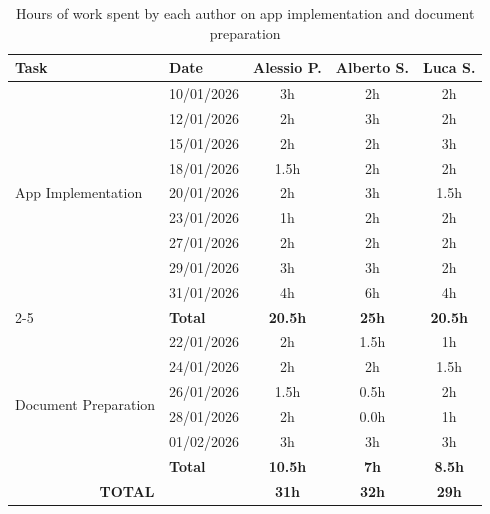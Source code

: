 \begin{table}[H]
\centering
\begin{tabular}{|p{4.5cm}|l|c|c|c|}
\hline
\textbf{Task} & \textbf{Date} & \textbf{Alessio P.} & \textbf{Alberto S.} & \textbf{Luca S.} \\ 
\hline

\multirow{9}{=}{App Implementation} 
& 10/01/2026 & 3h & 2h & 2h \\  
& 12/01/2026 & 2h & 3h & 2h \\
& 15/01/2026 & 2h & 2h & 3h \\
& 18/01/2026 & 1.5h & 2h & 2h \\
& 20/01/2026 & 2h & 3h & 1.5h \\
& 23/01/2026 & 1h & 2h & 2h \\
& 27/01/2026 & 2h & 2h & 2h \\
& 29/01/2026 & 3h & 3h & 2h \\
& 31/01/2026 & 4h & 6h & 4h \\
\cline{2-5}
& \textbf{Total} & \textbf{20.5h} & \textbf{25h} & \textbf{20.5h} \\ 
\hline

\multirow{6}{=}{Document Preparation} 
& 22/01/2026 & 2h & 1.5h & 1h \\  
& 24/01/2026 & 2h & 2h & 1.5h \\
& 26/01/2026 & 1.5h & 0.5h & 2h \\
& 28/01/2026 & 2h & 0.0h & 1h \\ %
& 01/02/2026 & 3h & 3h & 3h \\
\cline{2-5}
& \textbf{Total} & \textbf{10.5h} & \textbf{7h} & \textbf{8.5h} \\ 
\hline

\multicolumn{2}{|c|}{\textbf{TOTAL}} & \textbf{31h} & \textbf{32h} & \textbf{29h} \\
\hline

\end{tabular}
\caption{Hours of work spent by each author on app implementation and document preparation}
\label{tab:effort}
\end{table}